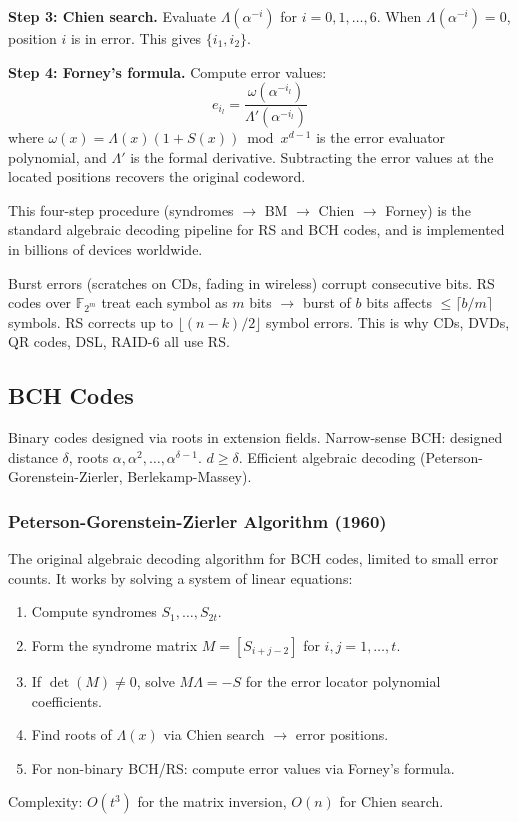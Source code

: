 \begin{example}
\textbf{Step 3: Chien search.} Evaluate $\Lambda(\alpha^{-i})$ for $i = 0, 1, \dots, 6$. When $\Lambda(\alpha^{-i}) = 0$, position $i$ is in error. This gives $\{i_1, i_2\}$.

\textbf{Step 4: Forney's formula.} Compute error values:
\[
e_{i_l} = \frac{\omega(\alpha^{-i_l})}{\Lambda'(\alpha^{-i_l})}
\]
where $\omega(x) = \Lambda(x)(1 + S(x)) \bmod x^{d-1}$ is the error evaluator polynomial, and $\Lambda'$ is the formal derivative. Subtracting the error values at the located positions recovers the original codeword.

This four-step procedure (syndromes $\to$ BM $\to$ Chien $\to$ Forney) is the standard algebraic decoding pipeline for RS and BCH codes, and is implemented in billions of devices worldwide.
\end{example}

Burst errors (scratches on CDs, fading in wireless) corrupt consecutive bits. RS codes over $\mathbb{F}_{2^m}$ treat each symbol as $m$ bits $\to$ burst of $b$ bits affects $\le \lceil b/m \rceil$ symbols. RS corrects up to $\lfloor (n-k)/2 \rfloor$ symbol errors. This is why CDs, DVDs, QR codes, DSL, RAID-6 all use RS.

\subsection{BCH Codes}
\label{sec:ec:bch}

Binary codes designed via roots in extension fields. Narrow-sense BCH: designed distance $\delta$, roots $\alpha, \alpha^2, \dots, \alpha^{\delta-1}$. $d \ge \delta$. Efficient algebraic decoding (Peterson-Gorenstein-Zierler, Berlekamp-Massey).

\subsubsection*{Peterson-Gorenstein-Zierler Algorithm (1960)}
The original algebraic decoding algorithm for BCH codes, limited to small error counts. It works by solving a system of linear equations:
\begin{enumerate}
\item Compute syndromes $S_1, \dots, S_{2t}$.
\item Form the syndrome matrix $M = [S_{i+j-2}]$ for $i,j = 1,\dots,t$.
\item If $\det(M) \neq 0$, solve $M \Lambda = -S$ for the error locator polynomial coefficients.
\item Find roots of $\Lambda(x)$ via Chien search $\to$ error positions.
\item For non-binary BCH/RS: compute error values via Forney's formula.
\end{enumerate}
Complexity: $O(t^3)$ for the matrix inversion, $O(n)$ for Chien search.

